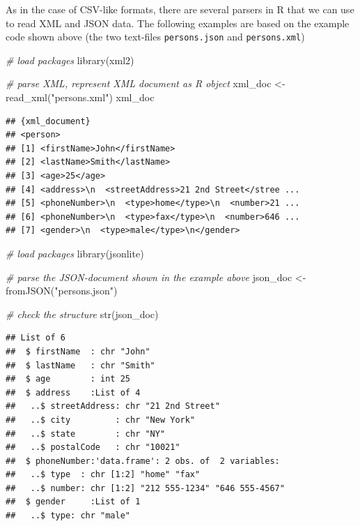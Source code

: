 \documentclass[
  12pt,
]{style/krantz}
\newenvironment{Shaded}{\begin{snugshade}}{\end{snugshade}}
\newcommand{\CommentTok}[1]{\textcolor[rgb]{0.56,0.35,0.01}{\textit{#1}}}
\newcommand{\FunctionTok}[1]{\textcolor[rgb]{0.00,0.00,0.00}{#1}}
\newcommand{\NormalTok}[1]{#1}
\newcommand{\OtherTok}[1]{\textcolor[rgb]{0.56,0.35,0.01}{#1}}
\newcommand{\StringTok}[1]{\textcolor[rgb]{0.31,0.60,0.02}{#1}}
\begin{document}
As in the case of CSV-like formats, there are several parsers in R that we can use to read XML and JSON data. The following examples are based on the example code shown above (the two text-files \texttt{persons.json} and \texttt{persons.xml})

\begin{Shaded}
\begin{Highlighting}[]
\CommentTok{\# load packages}
\FunctionTok{library}\NormalTok{(xml2)}

\CommentTok{\# parse XML, represent XML document as R object}
\NormalTok{xml\_doc }\OtherTok{\textless{}{-}} \FunctionTok{read\_xml}\NormalTok{(}\StringTok{"persons.xml"}\NormalTok{)}
\NormalTok{xml\_doc}
\end{Highlighting}
\end{Shaded}

\begin{verbatim}
## {xml_document}
## <person>
## [1] <firstName>John</firstName>
## [2] <lastName>Smith</lastName>
## [3] <age>25</age>
## [4] <address>\n  <streetAddress>21 2nd Street</stree ...
## [5] <phoneNumber>\n  <type>home</type>\n  <number>21 ...
## [6] <phoneNumber>\n  <type>fax</type>\n  <number>646 ...
## [7] <gender>\n  <type>male</type>\n</gender>
\end{verbatim}

\begin{Shaded}
\begin{Highlighting}[]
\CommentTok{\# load packages}
\FunctionTok{library}\NormalTok{(jsonlite)}

\CommentTok{\# parse the JSON{-}document shown in the example above}
\NormalTok{json\_doc }\OtherTok{\textless{}{-}} \FunctionTok{fromJSON}\NormalTok{(}\StringTok{"persons.json"}\NormalTok{)}

\CommentTok{\# check the structure}
\FunctionTok{str}\NormalTok{(json\_doc)}
\end{Highlighting}
\end{Shaded}

\begin{verbatim}
## List of 6
##  $ firstName  : chr "John"
##  $ lastName   : chr "Smith"
##  $ age        : int 25
##  $ address    :List of 4
##   ..$ streetAddress: chr "21 2nd Street"
##   ..$ city         : chr "New York"
##   ..$ state        : chr "NY"
##   ..$ postalCode   : chr "10021"
##  $ phoneNumber:'data.frame': 2 obs. of  2 variables:
##   ..$ type  : chr [1:2] "home" "fax"
##   ..$ number: chr [1:2] "212 555-1234" "646 555-4567"
##  $ gender     :List of 1
##   ..$ type: chr "male"
\end{verbatim}
\end{document}
